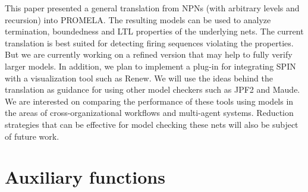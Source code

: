 \documentclass{llncs}
\begin{document}
This paper presented a general translation from NPNs (with arbitrary levels and recursion) into PROMELA. The resulting models can be used to analyze termination, boundedness and LTL properties of the underlying nets. The current translation is best suited for detecting firing sequences violating the properties. But we are currently working on a refined version that may help to fully verify larger models. In addition, we plan to implement a plug-in for integrating SPIN with a visualization tool such as Renew. We will use the ideas behind the translation as guidance for using other model checkers such as JPF2 and Maude. We are interested on comparing the performance of these tools using models in the areas of cross-organizational workflows and multi-agent systems.  Reduction strategies that can be effective for model checking these nets will also be subject of future work.







\newpage

\appendix


\section{Auxiliary functions}
\label{app:aux.code}
\end{document}
